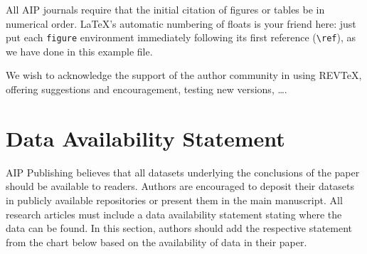 \documentclass[%
 aip,
 amsmath,amssymb,
 reprint,%
]{revtex4-2}
\begin{document}
All AIP journals require that the initial citation of
figures or tables be in numerical order.
\LaTeX's automatic numbering of floats is your friend here:
just put each \texttt{figure} environment immediately following 
its first reference (\verb+\ref+), as we have done in this example file. 

\begin{acknowledgments}
We wish to acknowledge the support of the author community in using
REV\TeX{}, offering suggestions and encouragement, testing new versions,
\dots.
\end{acknowledgments}

\section*{Data Availability Statement}

AIP Publishing believes that all datasets underlying the conclusions of the paper should be available to readers. Authors are encouraged to deposit their datasets in publicly available repositories or present them in the main manuscript. All research articles must include a data availability statement stating where the data can be found. In this section, authors should add the respective statement from the chart below based on the availability of data in their paper.
\end{document}

